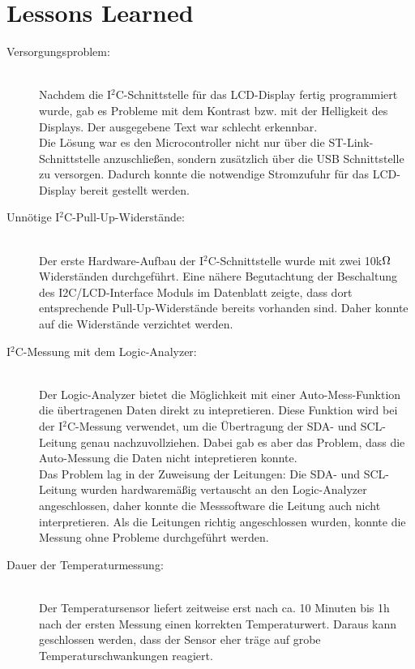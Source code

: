 \documentclass[12pt,a4paper]{article}
\renewcommand{\lstlistlistingname}{Codelisting}
\renewcommand{\lstlistoflistings}{\begingroup
	\tocfile{\lstlistlistingname}{lol}
\endgroup}
\begin{document}
\section{Lessons Learned}
\begin{description}
	\item[Versorgungsproblem:]\hfill \\
	Nachdem die I$^2$C-Schnittstelle für das LCD-Display fertig programmiert wurde, gab es Probleme mit dem Kontrast bzw. mit der Helligkeit des Displays. Der ausgegebene Text war schlecht erkennbar. \\
	Die Lösung war es den Microcontroller nicht nur über die ST-Link-Schnittstelle anzuschließen, sondern zusätzlich über die USB Schnittstelle zu versorgen.
	Dadurch konnte die notwendige Stromzufuhr für das LCD-Display bereit gestellt werden.
	\item[Unnötige I$^2$C-Pull-Up-Widerstände:]\hfill \\
	Der erste Hardware-Aufbau der I$^2$C-Schnittstelle wurde mit zwei 10k$\ohm$ Widerständen durchgeführt. Eine nähere Begutachtung der Beschaltung des I2C/LCD-Interface Moduls im Datenblatt zeigte, dass dort entsprechende Pull-Up-Widerstände bereits vorhanden sind. Daher konnte auf die Widerstände verzichtet werden.
	\item[I$^2$C-Messung mit dem Logic-Analyzer:]\hfill \\
	Der Logic-Analyzer bietet die Möglichkeit mit einer Auto-Mess-Funktion die übertragenen Daten direkt zu intepretieren. Diese Funktion wird bei der I$^2$C-Messung verwendet, um
	die Übertragung der SDA- und SCL-Leitung genau nachzuvollziehen. Dabei gab es aber das Problem, dass die Auto-Messung die Daten nicht intepretieren konnte. \\
	Das Problem lag in der Zuweisung der Leitungen: Die SDA- und SCL-Leitung wurden hardwaremäßig vertauscht an den Logic-Analyzer angeschlossen, daher konnte die Messsoftware die Leitung auch nicht interpretieren. Als die Leitungen richtig angeschlossen wurden, konnte die Messung ohne Probleme durchgeführt werden.
	\item[Dauer der Temperaturmessung:]\hfill \\
	Der Temperatursensor liefert zeitweise erst nach ca. 10 Minuten bis 1h nach der ersten Messung einen korrekten Temperaturwert.
	Daraus kann geschlossen werden, dass der Sensor eher träge auf grobe Temperaturschwankungen reagiert.
\end{description}

\pagebreak
\listoffigures
\lstlistoflistings
\end{document}
